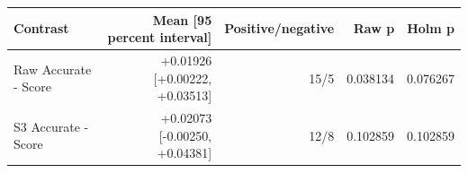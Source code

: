 \begin{tabular}{lrrrr}
\toprule
Contrast & Mean [95 percent interval] & Positive/negative & Raw p & Holm p \\
\midrule
Raw Accurate - Score & +0.01926 [+0.00222, +0.03513] & 15/5 & 0.038134 & 0.076267 \\
S3 Accurate - Score & +0.02073 [-0.00250, +0.04381] & 12/8 & 0.102859 & 0.102859 \\
\bottomrule
\end{tabular}
